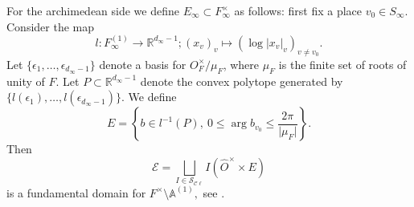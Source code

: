 \documentclass[a4paper,11pt]{amsart}
\theoremstyle{definition}
\newcommand{\A}{\mathbb{A}}
\newcommand{\R}{\mathbb{R}}
\newcommand{\cl}{\mathcal{C}\ell}
\begin{document}
For the archimedean side we define $E_{\infty}\subset F_{\infty}^{\times}$ as follows: first fix a place $v_0 \in S_{\infty}$. Consider the map \begin{equation*}l \colon F_{\infty}^{(1)}\to \R^{d_{\infty}-1}; (x_v)_v \mapsto (\log\vert{x_v}\vert_v)_{v\neq v_0}.\end{equation*} Let $\{\epsilon_1,\dots,\epsilon_{d_{\infty}-1}\}$ denote a basis for $O_F^{\times}/\mu_F$, where $\mu_F$ is the finite set of roots of unity of $F$. Let $P\subset \R^{d_{\infty}-1}$ denote the convex polytope generated by $\{l(\epsilon_1),\dots,l(\epsilon_{d_{\infty}-1})\}$. We define \begin{equation}\label{eq:definitionE}
    E = \left\{b\in l^{-1}(P),\ 0\leq \operatorname{arg}b_{v_0} \leq \frac{2\pi}{\vert{\mu_F}\vert}\right\}.\end{equation}
 Then \begin{equation*}\label{eq:fundamentaldomain2}\mathcal{E} = \bigsqcup_{I\in \mathcal{S}_{\cl}} I(\widehat{O}^{\times}\times E)\end{equation*}is a fundamental domain for $F^{\times}\setminus
\A^{(1)},$ see \cite[Chapter VII §3,\ Theorem 6]{lang1986algebraic}.




    
\end{document}

